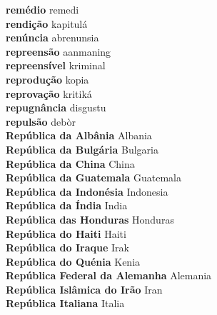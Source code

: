 \textbf{ remédio  } remedi \\
\textbf{ rendição  } kapitulá \\
\textbf{ renúncia  } abrenunsia \\
\textbf{ repreensão  } aanmaning \\
\textbf{ repreensível  } kriminal \\
\textbf{ reprodução  } kopia \\
\textbf{ reprovação  } kritiká \\
\textbf{ repugnância  } disgustu \\
\textbf{ repulsão  } debòr \\
\textbf{ República da Albânia  } Albania \\
\textbf{ República da Bulgária  } Bulgaria \\
\textbf{ República da China  } China \\
\textbf{ República da Guatemala  } Guatemala \\
\textbf{ República da Indonésia  } Indonesia \\
\textbf{ República da Índia  } India \\
\textbf{ República das Honduras  } Honduras \\
\textbf{ República do Haiti  } Haiti \\
\textbf{ República do Iraque  } Irak \\
\textbf{ República do Quénia  } Kenia \\
\textbf{ República Federal da Alemanha  } Alemania \\
\textbf{ República Islâmica do Irão  } Iran \\
\textbf{ República Italiana  } Italia \\
